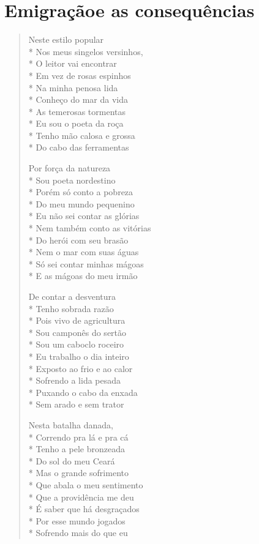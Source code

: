 \chapter[Emigração e as consequências]{Emigração\break e as consequências}

\begin{verse}
Neste estilo popular\\*
Nos meus singelos versinhos,\\*
O leitor vai encontrar\\*
Em vez de rosas espinhos\\*
Na minha penosa lida\\*
Conheço do mar da vida\\*
As temerosas tormentas\\*
Eu sou o poeta da roça\\*
Tenho mão calosa e grossa\\*
Do cabo das ferramentas

Por força da natureza\\*
Sou poeta nordestino\\*
Porém só conto a pobreza\\*
Do meu mundo pequenino\\*
Eu não sei contar as glórias\\*
Nem também conto as vitórias\\*
Do herói com seu brasão\\*
Nem o mar com suas águas\\*
Só sei contar minhas mágoas\\*
E as mágoas do meu irmão

De contar a desventura\\*
Tenho sobrada razão\\*
Pois vivo de agricultura\\*
Sou camponês do sertão\\*
Sou um caboclo roceiro\\*
Eu trabalho o dia inteiro\\*
Exposto ao frio e ao calor\\*
Sofrendo a lida pesada\\*
Puxando o cabo da enxada\\*
Sem arado e sem trator

Nesta batalha danada,\\*
Correndo pra lá e pra cá\\*
Tenho a pele bronzeada\\*
Do sol do meu Ceará\\*
Mas o grande sofrimento\\*
Que abala o meu sentimento\\*
Que a providência me deu\\*
É saber que há desgraçados\\*
Por esse mundo jogados\\*
Sofrendo mais do que eu


\end{verse}
